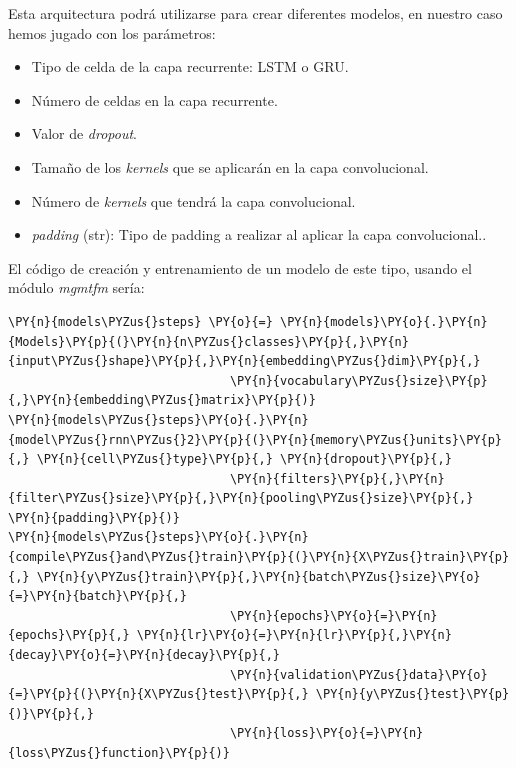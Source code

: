 Esta arquitectura podrá utilizarse para crear diferentes modelos, en nuestro caso hemos jugado con los parámetros: 


\begin{itemize}

\item Tipo de celda de la capa recurrente: LSTM o GRU. 
\item Número de celdas en la capa recurrente. 
\item Valor de \textit{dropout}.
\item Tamaño de los \textit{kernels} que se aplicarán en la capa convolucional. 
\item Número de \textit{kernels} que tendrá la capa convolucional. 
\item \textit{padding} (str): Tipo de padding a realizar al aplicar la capa convolucional..
\end{itemize}

El código de creación y entrenamiento de un modelo de este tipo, usando el módulo \textit{mgmtfm} sería: 

\vspace{0.5cm}

    
    \begin{tcolorbox}[breakable, size=fbox, boxrule=1pt, pad at break*=1mm,colback=cellbackground, colframe=cellborder]

\begin{Verbatim}[commandchars=\\\{\}]
\PY{n}{models\PYZus{}steps} \PY{o}{=} \PY{n}{models}\PY{o}{.}\PY{n}{Models}\PY{p}{(}\PY{n}{n\PYZus{}classes}\PY{p}{,}\PY{n}{input\PYZus{}shape}\PY{p}{,}\PY{n}{embedding\PYZus{}dim}\PY{p}{,}
                               \PY{n}{vocabulary\PYZus{}size}\PY{p}{,}\PY{n}{embedding\PYZus{}matrix}\PY{p}{)}
\PY{n}{models\PYZus{}steps}\PY{o}{.}\PY{n}{model\PYZus{}rnn\PYZus{}2}\PY{p}{(}\PY{n}{memory\PYZus{}units}\PY{p}{,} \PY{n}{cell\PYZus{}type}\PY{p}{,} \PY{n}{dropout}\PY{p}{,}
                               \PY{n}{filters}\PY{p}{,}\PY{n}{filter\PYZus{}size}\PY{p}{,}\PY{n}{pooling\PYZus{}size}\PY{p}{,} \PY{n}{padding}\PY{p}{)}
\PY{n}{models\PYZus{}steps}\PY{o}{.}\PY{n}{compile\PYZus{}and\PYZus{}train}\PY{p}{(}\PY{n}{X\PYZus{}train}\PY{p}{,} \PY{n}{y\PYZus{}train}\PY{p}{,}\PY{n}{batch\PYZus{}size}\PY{o}{=}\PY{n}{batch}\PY{p}{,} 
                               \PY{n}{epochs}\PY{o}{=}\PY{n}{epochs}\PY{p}{,} \PY{n}{lr}\PY{o}{=}\PY{n}{lr}\PY{p}{,}\PY{n}{decay}\PY{o}{=}\PY{n}{decay}\PY{p}{,} 
                               \PY{n}{validation\PYZus{}data}\PY{o}{=}\PY{p}{(}\PY{n}{X\PYZus{}test}\PY{p}{,} \PY{n}{y\PYZus{}test}\PY{p}{)}\PY{p}{,}
                               \PY{n}{loss}\PY{o}{=}\PY{n}{loss\PYZus{}function}\PY{p}{)} 
\end{Verbatim}
\end{tcolorbox}






